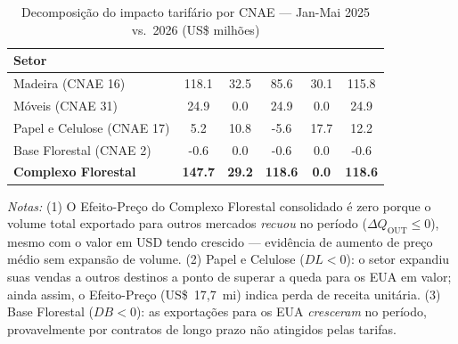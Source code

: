 \documentclass[12pt, a4paper]{article}
\begin{document}
\begin{table}[H]
  \centering
  \caption{Decomposição do impacto tarifário por CNAE — Jan-Mai 2025 vs.\ 2026 (US\$ milhões)}
  \label{tab:decomp}
  \renewcommand{\arraystretch}{1.35}
  \small
  \begin{tabular}{
      l
      S[table-format=3.1]
      S[table-format=2.1]
      S[table-format=3.1]
      S[table-format=2.1]
      S[table-format=3.1]
    }
    \toprule
    \textbf{Setor}
      & \textbf{}
      & \textbf{}
      & \textbf{}
      & \textbf{}
      & \textbf{} \\
    \midrule
    Madeira (CNAE 16)          & 118.1 & 32.5 &  85.6 & 30.1 & 115.8 \\
    Móveis (CNAE 31)           &  24.9 &  0.0 &  24.9 &  0.0 &  24.9 \\
    Papel e Celulose (CNAE 17) &   5.2 & 10.8 &  -5.6 & 17.7 &  12.2 \\
    Base Florestal (CNAE 2)    &  -0.6 &  0.0 &  -0.6 &  0.0 &  -0.6 \\
    \midrule
    \textbf{Complexo Florestal}& \textbf{147.7} & \textbf{29.2}
      & \textbf{118.6} & \textbf{0.0} & \textbf{118.6} \\
    \bottomrule
  \end{tabular}
  \vspace{0.4em}
  \begin{minipage}{\textwidth}
    \footnotesize
    \textit{Notas:} (1) O Efeito-Preço do Complexo Florestal consolidado é zero porque
    o volume total exportado para outros mercados \emph{recuou} no período
    ($\Delta Q_{\text{OUT}} \leq 0$), mesmo com o valor em USD tendo crescido
    — evidência de aumento de preço médio sem expansão de volume.
    (2) Papel e Celulose ($DL < 0$): o setor expandiu suas vendas a outros
    destinos a ponto de superar a queda para os EUA em valor; ainda assim,
    o Efeito-Preço (US\$~17,7~mi) indica perda de receita unitária.
    (3) Base Florestal ($DB < 0$): as exportações para os EUA \emph{cresceram}
    no período, provavelmente por contratos de longo prazo não atingidos pelas tarifas.
  \end{minipage}
\end{table}
\end{document}
